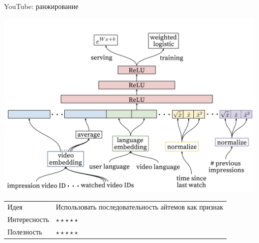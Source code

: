 \documentclass[11pt,aspectratio=169,handout]{beamer}
\begin{document}
\begin{frame}{YouTube: ранжирование}

\begin{center}
\includegraphics[scale=0.3]{images/youtube-rank.png}
\end{center}

\vfill
\begin{small}
\begin{tabular}{l l}
Идея & Использовать последовательность айтемов как признак \\
Интересность & $\star\star\star\star\star$ \\
Полезность & $\star\star\star\star\star$
\end{tabular}
\end{small}

\end{frame}
\end{document}
